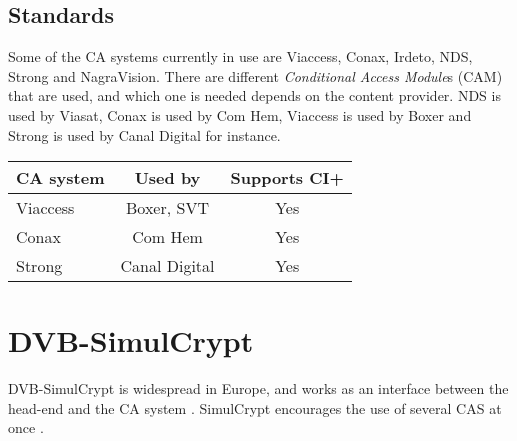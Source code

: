 \subsection{Standards}
Some of the CA systems currently in use are Viaccess, Conax, Irdeto, NDS, Strong 
and NagraVision. There are different \emph{Conditional Access Module}s (CAM) 
that are used, and which one is needed depends on the content provider. NDS is 
used by Viasat, Conax is used by Com Hem, Viaccess is used by Boxer and Strong 
is used by Canal Digital for instance.

\begin{longtable}{| l | c | c |}
  \hline
  CA system & Used by & Supports CI+ \\ \hline
  
  Viaccess & Boxer, SVT & Yes \\ \hline
  Conax & Com Hem & Yes \\ \hline
  Strong & Canal Digital & Yes \\ \hline
\end{longtable}




\section{DVB-SimulCrypt} \label{sec:Simul}
DVB-SimulCrypt is widespread in Europe, and works as an interface 
between the head-end and the CA system \citep{SimulCrypt:2008}. 
SimulCrypt encourages the use of several CAS at once 
\citep[p. 17]{SimulCrypt:2008}.

